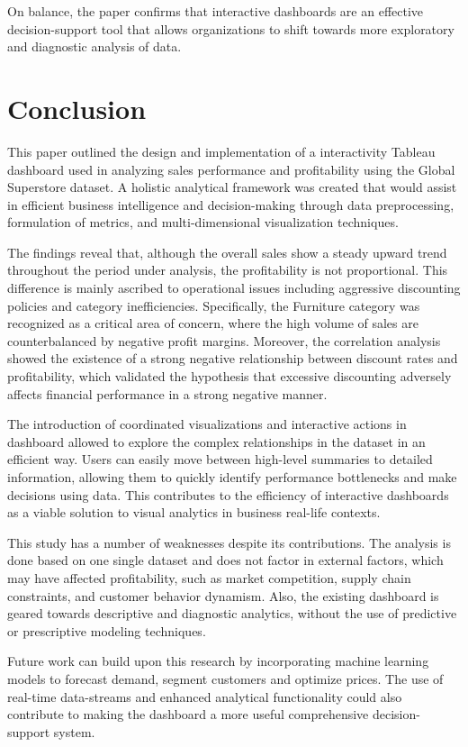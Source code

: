 \documentclass[conference]{IEEEtran}
\begin{document}
{{On balance, the paper confirms that interactive dashboards are an effective decision-support tool that allows organizations to shift towards more exploratory and diagnostic analysis of data.

\section*{Conclusion}
This paper outlined the design and implementation of a interactivity Tableau dashboard used in analyzing sales performance and profitability using the Global Superstore dataset. A holistic analytical framework was created that would assist in efficient business intelligence and decision-making through data preprocessing, formulation of metrics, and multi-dimensional visualization techniques.

The findings reveal that, although the overall sales show a steady upward trend throughout the period under analysis, the profitability is not proportional. This difference is mainly ascribed to operational issues including aggressive discounting policies and category inefficiencies. Specifically, the Furniture category was recognized as a critical area of concern, where the high volume of sales are counterbalanced by negative profit margins. Moreover, the correlation analysis showed the existence of a strong negative relationship between discount rates and profitability, which validated the hypothesis that excessive discounting adversely affects financial performance in a strong negative manner.

The introduction of coordinated visualizations and interactive actions in dashboard allowed to explore the complex relationships in the dataset in an efficient way. Users can easily move between high-level summaries to detailed information, allowing them to quickly identify performance bottlenecks and make decisions using data. This contributes to the efficiency of interactive dashboards as a viable solution to visual analytics in business real-life contexts.

This study has a number of weaknesses despite its contributions. The analysis is done based on one single dataset and does not factor in external factors, which may have affected profitability, such as market competition, supply chain constraints, and customer behavior dynamism. Also, the existing dashboard is geared towards descriptive and diagnostic analytics, without the use of predictive or prescriptive modeling techniques.

Future work can build upon this research by incorporating machine learning models to forecast demand, segment customers and optimize prices. The use of real-time data-streams and enhanced analytical functionality could also contribute to making the dashboard a more useful comprehensive decision-support system.

}}
\end{document}
